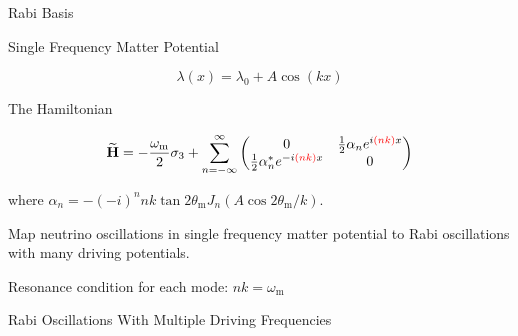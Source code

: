\documentclass[9pt]{beamer}
\begin{document}
\begin{darkframes}
\begin{frame}{Rabi Basis}
\end{frame}














\begin{frame}{Single Frequency Matter Potential}



\begin{equation*}
\lambda(x) = \lambda_0 +  A \cos(k x )
\end{equation*}


\begin{tcolorbox}[title=Hamiltonian in Rabi Basis]

The Hamiltonian


\begin{equation*}
\mathbf{\widetilde H}= -\frac{\omega_{\mathrm m}}{2}\sigma_3 + \sum_{n=-\infty}^{\infty} \begin{pmatrix}
0 & \frac{1}{2}  \alpha_n e^{i  {\color{red} (n k) } x}\\
\frac{1}{2}  \alpha_n^* e^{ -i  {\color{red} (n k) } x} & 0
\end{pmatrix}
\end{equation*}


where $\alpha_n =  - (-i)^n  n  k \tan 2\theta_{\mathrm{m}}  J_n ( A \cos 2\theta_{\mathrm{m}} / k )$.


\end{tcolorbox}





\pause

\begin{tcolorbox}
\centering
Map neutrino oscillations in single frequency matter potential to Rabi oscillations with many driving potentials.
\end{tcolorbox}


\begin{tcolorbox}
\centering
Resonance condition for each mode: $nk=\omega_{\mathrm m}$
\end{tcolorbox}




\end{frame}



\begin{frame}{Rabi Oscillations With Multiple Driving Frequencies}



\end{frame}
\end{darkframes}
\end{document}
